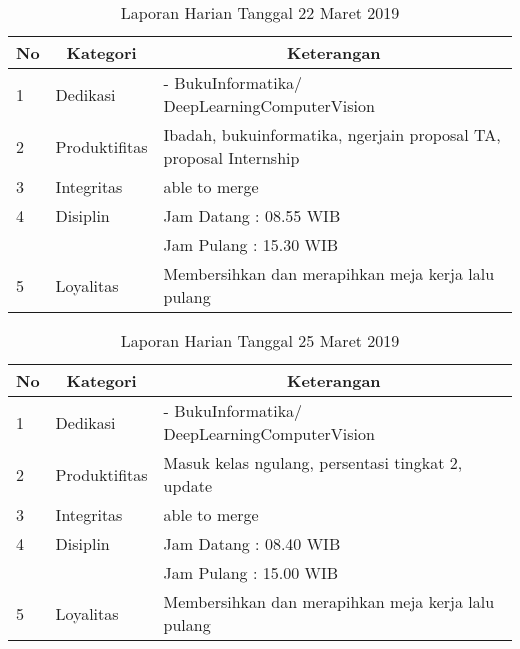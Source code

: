 \begin{table}[htp]
\caption{Laporan Harian Tanggal 22 Maret 2019}
\label{tab:lh220319}
\begin{tabular}{|l|l|l|}
\hline
\textbf{No} & \multicolumn{1}{c|}{\textbf{Kategori}} & \multicolumn{1}{c|}{\textbf{Keterangan}} \\ \hline
1 & Dedikasi & - BukuInformatika/ DeepLearningComputerVision \\ \hline
2 & Produktifitas & Ibadah, bukuinformatika, ngerjain proposal TA, proposal Internship  \\
3 & Integritas & able to merge \\ \hline
4 & Disiplin & Jam Datang : 08.55 WIB \\
 &  & Jam Pulang : 15.30 WIB \\ \hline
5 & Loyalitas & Membersihkan dan merapihkan meja kerja lalu pulang  \\ \hline
\end{tabular}
\end{table}

\begin{table}[htp]
\caption{Laporan Harian Tanggal 25 Maret 2019}
\label{tab:lh250319}
\begin{tabular}{|l|l|l|}
\hline
\textbf{No} & \multicolumn{1}{c|}{\textbf{Kategori}} & \multicolumn{1}{c|}{\textbf{Keterangan}} \\ \hline
1 & Dedikasi & - BukuInformatika/ DeepLearningComputerVision \\ \hline
2 & Produktifitas & Masuk kelas ngulang, persentasi tingkat 2, update  \\
3 & Integritas & able to merge \\ \hline
4 & Disiplin & Jam Datang : 08.40 WIB \\
 &  & Jam Pulang : 15.00 WIB \\ \hline
5 & Loyalitas & Membersihkan dan merapihkan meja kerja lalu pulang  \\ \hline
\end{tabular}
\end{table}


